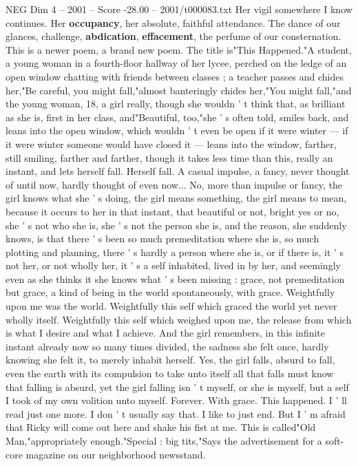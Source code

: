 \begin{textsample}{NEG Dim 4 – 2001 – Score -28.00 – 2001/t000083.txt}
Her vigil somewhere I know continues.
Her \textbf{occupancy}, her absolute, faithful attendance.
The dance of our glances, challenge, \textbf{abdication}, \textbf{effacement}, the perfume of our consternation.
This is a newer poem, a brand new poem.
The title is"This Happened."A student, a young woman in a fourth-floor hallway of her lycee, perched on the ledge of an open window chatting with friends between classes ; a teacher passes and chides her,"Be careful, you might fall,"almost banteringly chides her,"You might fall,"and the young woman, 18, a girl really, though she wouldn ' t think that, as brilliant as she is, first in her class, and"Beautiful, too,"she ' s often told, smiles back, and leans into the open window, which wouldn ' t even be open if it were winter — if it were winter someone would have closed it — leans into the window, farther, still smiling, farther and farther, though it takes less time than this, really an instant, and lets herself fall.
Herself fall.
A casual impulse, a fancy, never thought of until now, hardly thought of even now...
No, more than impulse or fancy, the girl knows what she ' s doing, the girl means something, the girl means to mean, because it occurs to her in that instant, that beautiful or not, bright yes or no, she ' s not who she is, she ' s not the person she is, and the reason, she suddenly knows, is that there ' s been so much premeditation where she is, so much plotting and planning, there ' s hardly a person where she is, or if there is, it ' s not her, or not wholly her, it ' s a self inhabited, lived in by her, and seemingly even as she thinks it she knows what ' s been missing : grace, not premeditation but grace, a kind of being in the world spontaneously, with grace.
Weightfully upon me was the world.
Weightfully this self which graced the world yet never wholly itself.
Weightfully this self which weighed upon me, the release from which is what I desire and what I achieve.
And the girl remembers, in this infinite instant already now so many times divided, the sadness she felt once, hardly knowing she felt it, to merely inhabit herself.
Yes, the girl falls, absurd to fall, even the earth with its compulsion to take unto itself all that falls must know that falling is absurd, yet the girl falling isn ' t myself, or she is myself, but a self I took of my own volition unto myself.
Forever.
With grace.
This happened.
I ' ll read just one more.
I don ' t usually say that.
I like to just end.
But I ' m afraid that Ricky will come out here and shake his fist at me.
This is called"Old Man,"appropriately enough."Special : big tits,"Says the advertisement for a soft-core magazine on our neighborhood newsstand.

\end{textsample}
